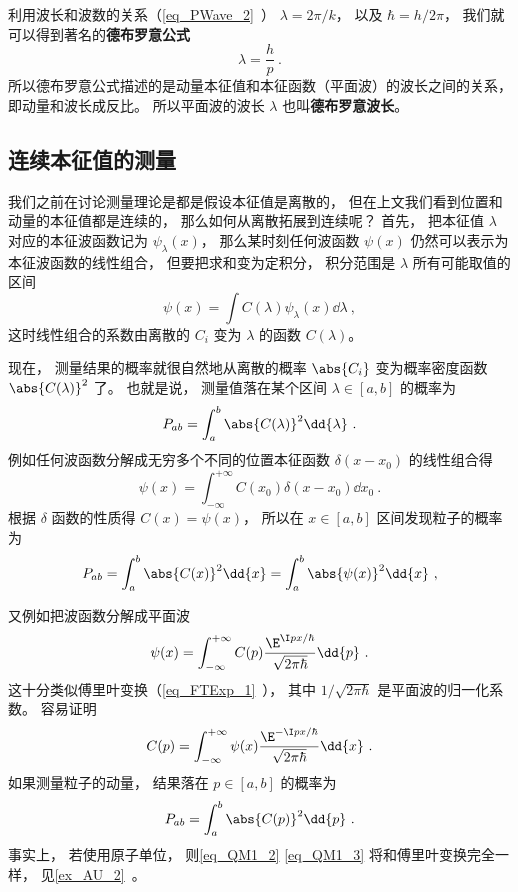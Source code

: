 利用波长和波数的关系（\autoref{eq_PWave_2}~）
$\lambda = 2\pi/k$， 以及 $\hbar = h/2\pi$， 我们就可以得到著名的\textbf{德布罗意公式}
\begin{equation}
\lambda = \frac{h}{p}~.
\end{equation}
所以德布罗意公式描述的是动量本征值和本征函数（平面波）的波长之间的关系， 即动量和波长成反比。 所以平面波的波长 $\lambda$ 也叫\textbf{德布罗意波长}。

\subsection{连续本征值的测量}
我们之前在讨论测量理论是都是假设本征值是离散的， 但在上文我们看到位置和动量的本征值都是连续的， 那么如何从离散拓展到连续呢？ 首先， 把本征值 $\lambda$ 对应的本征波函数记为 $\psi_\lambda(x)$， 那么某时刻任何波函数 $\psi(x)$ 仍然可以表示为本征波函数的线性组合， 但要把求和变为定积分， 积分范围是 $\lambda$ 所有可能取值的区间
\begin{equation}
\psi(x) = \int C(\lambda)\psi_\lambda(x) \dd{\lambda}~,
\end{equation}
这时线性组合的系数由离散的 $C_i$ 变为 $\lambda$ 的函数 $C(\lambda)$。

现在， 测量结果的概率就很自然地从离散的概率 $\abs{C_i}$ 变为概率密度函数 $\abs{C(\lambda)}^2$ 了。 也就是说， 测量值落在某个区间 $\lambda \in [a, b]$ 的概率为
\begin{equation}
P_{ab} = \int_a^b \abs{C(\lambda)}^2 \dd{\lambda}~.
\end{equation}
例如任何波函数分解成无穷多个不同的位置本征函数 $\delta(x-x_0)$ 的线性组合得
\begin{equation}
\psi(x) = \int_{-\infty}^{+\infty} C(x_0) \delta(x - x_0) \dd{x_0}~.
\end{equation}
根据 $\delta$ 函数的性质得 $C(x) = \psi(x)$， 所以在 $x \in [a, b]$ 区间发现粒子的概率为
\begin{equation}
P_{ab} = \int_a^b \abs{C(x)}^2\dd{x} = \int_a^b \abs{\psi(x)}^2\dd{x}~,
\end{equation}

又例如把波函数分解成平面波
\begin{equation}\label{eq_QM1_2}
\psi(x) = \int_{-\infty}^{+\infty} C(p)\frac{\E^{\I p x/\hbar}}{\sqrt{2\pi\hbar}} \dd{p}~.
\end{equation}
这十分类似傅里叶变换（\autoref{eq_FTExp_1}~）， 其中 $1/\sqrt{2\pi\hbar}$ 是平面波的归一化系数。 容易证明
\begin{equation}\label{eq_QM1_3}
C(p) = \int_{-\infty}^{+\infty} \psi(x) \frac{\E^{-\I p x/\hbar}}{\sqrt{2\pi\hbar}} \dd{x}~.
\end{equation}
如果测量粒子的动量， 结果落在 $p \in [a, b]$ 的概率为
\begin{equation}
P_{ab} = \int_a^b \abs{C(p)}^2 \dd{p}~.
\end{equation}
事实上， 若使用原子单位， 则\autoref{eq_QM1_2} \autoref{eq_QM1_3} 将和傅里叶变换完全一样， 见\autoref{ex_AU_2}~。

